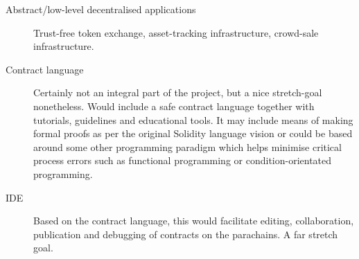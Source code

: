 \begin{description}
\item[Abstract/low-level decentralised applications] Trust-free token exchange, asset-tracking infrastructure, crowd-sale infrastructure.

\item[Contract language] Certainly not an integral part of the project, but a nice stretch-goal nonetheless. Would include a safe contract language together with tutorials, guidelines and educational tools. It may include means of making formal proofs as per the original Solidity language vision or could be based around some other programming paradigm which helps minimise critical process errors such as functional programming or condition-orientated programming.

\item[IDE] Based on the contract language, this would facilitate editing, collaboration, publication and debugging of contracts on the parachains. A far stretch goal.

\end{description}
